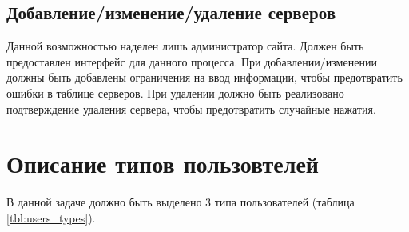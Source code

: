 \subsection{Добавление/изменение/удаление серверов}

Данной возможностью наделен лишь администратор сайта. Должен быть предоставлен интерфейс для данного процесса. При добавлении/изменении должны быть добавлены ограничения на ввод информации, чтобы предотвратить ошибки в таблице серверов. При удалении должно быть реализовано подтверждение удаления сервера, чтобы предотвратить случайные нажатия.


\section{Описание типов пользовтелей}

В данной задаче должно быть выделено 3 типа пользователей (таблица \ref{tbl:users_types}).


